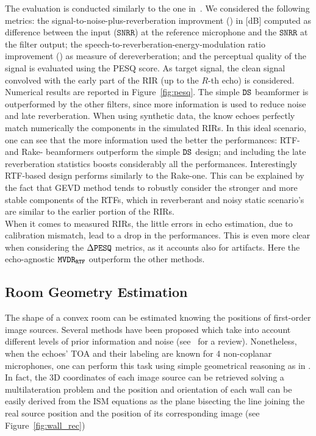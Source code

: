 The evaluation is conducted similarly to the one in~. We considered the following metrics: the signal-to-noise-plus-reverberation improvment (\DSNRR) in [dB] computed as difference between the input ($\mathtt{SNRR}$) at the reference microphone and the $\mathtt{SNRR}$ at the filter output; the speech-to-reverberation-energy-modulation ratio improvement (\DSRMR) as measure of dereverberation; and the perceptual quality of the signal is evaluated using the PESQ score.
As target signal, the clean signal convolved with the early part of the RIR (up to the $R$-th echo) is considered.
\\Numerical results are reported in Figure~\ref{fig:pesq}.
The simple $\mathtt{DS}$ beamformer is outperformed by the other filters, since more information is used to reduce noise and late reverberation.
When using synthetic data, the know echoes perfectly match numerically the components in the simulated RIRs. In this ideal scenario, one can see that the more information used the better the performances: RTF- and Rake- beamformers outperform the simple $\mathtt{DS}$ design; and including the late reverberation statistics boosts considerably all the performances.
Interestingly RTF-based design performs similarly to the Rake-one. This can be explained by the fact that GEVD method tends to robustly consider the stronger and more stable components of the RTFs, which in reverberant and noisy static scenario's are similar to the earlier portion of the RIRs.
\\When it comes to measured RIRs, the little errors in echo estimation, due to calibration mismatch, lead to a drop in the performances. This is even more clear when considering the $\Delta\mathtt{PESQ}$ metrics, as it accounts also for artifacts. Here the echo-agnostic $\mathtt{MVDR}_\mathtt{RTF}$ outperform the other methods.



\subsection{Room Geometry Estimation}
The shape of a convex room can be estimated knowing the positions of first-order image sources. Several methods have been proposed which take into account different levels of prior information and noise (see~ for a review). Nonetheless, when the echoes' TOA and their labeling are known for 4 non-coplanar microphones, one can perform this task using simple geometrical reasoning as in . In fact, the 3D coordinates of each image source can be retrieved solving a multilateration problem  and the position and orientation of each wall can be easily derived from the ISM equations as the plane bisecting the line joining the real source position and the position of its corresponding image (see Figure~\ref{fig:wall_rec})

